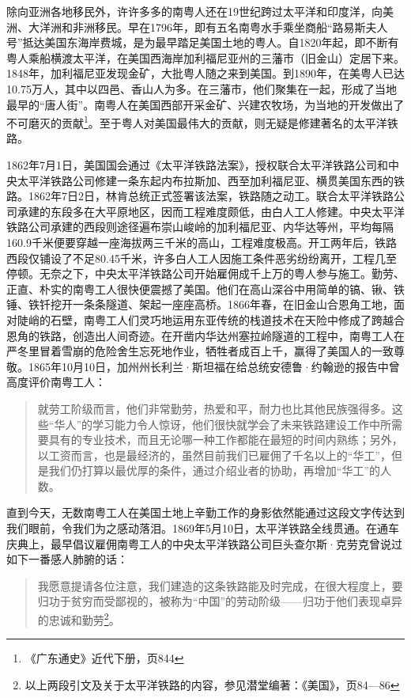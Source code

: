 除向亚洲各地移民外，许许多多的南粤人还在19世纪跨过太平洋和印度洋，向美洲、大洋洲和非洲移民。早在1796年，即有五名南粤水手乘坐商船“路易斯夫人号”抵达美国东海岸费城，是为最早踏足美国土地的粤人。自1820年起，即不断有粤人乘船横渡太平洋，在美国西海岸加利福尼亚州的三藩市（旧金山）定居下来。1848年，加利福尼亚发现金矿，大批粤人随之来到美国。到1890年，在美粤人已达10.75万人，其中以四邑、香山人为多。在三藩市，他们聚集在一起，形成了当地最早的“唐人街”。南粤人在美国西部开采金矿、兴建农牧场，为当地的开发做出了不可磨灭的贡献\footnote{《广东通史》近代下册，页844}。至于粤人对美国最伟大的贡献，则无疑是修建著名的太平洋铁路。

1862年7月1日，美国国会通过《太平洋铁路法案》，授权联合太平洋铁路公司和中央太平洋铁路公司修建一条东起内布拉斯加、西至加利福尼亚、横贯美国东西的铁路。1862年7日2日，林肯总统正式签署该法案，铁路随之动工。联合太平洋铁路公司承建的东段多在大平原地区，因而工程难度颇低，由白人工人修建。中央太平洋铁路公司承建的西段则途径遍布崇山峻岭的加利福尼亚、内华达等州，平均每隔160.9千米便要穿越一座海拔两三千米的高山，工程难度极高。开工两年后，铁路西段仅铺设了不足80.45千米，许多白人工人因施工条件恶劣纷纷离开，工程几至停顿。无奈之下，中央太平洋铁路公司开始雇佣成千上万的粤人参与施工。勤劳、正直、朴实的南粤工人很快便震撼了美国。他们在高山深谷中用简单的镐、锹、铁锤、铁钎挖开一条条隧道、架起一座座高桥。1866年春，在旧金山合恩角工地，面对陡峭的石壁，南粤工人们灵巧地运用东亚传统的栈道技术在天险中修成了跨越合恩角的铁路，创造出人间奇迹。在开凿内华达州塞拉岭隧道的工程中，南粤工人在严冬里冒着雪崩的危险舍生忘死地作业，牺牲者成百上千，赢得了美国人的一致尊敬。1865年10月10日，加州州长利兰·斯坦福在给总统安德鲁·约翰逊的报告中曾高度评价南粤工人：

\begin{quote}

就劳工阶级而言，他们非常勤劳，热爱和平，耐力也比其他民族强得多。这些“华人”的学习能力令人惊讶，他们很快就学会了未来铁路建设工作中所需要具有的专业技术，而且无论哪一种工作都能在最短的时间内熟练；另外，以工资而言，也是最经济的，虽然目前我们已雇佣了千名以上的“华工”，但是我们仍打算以最优厚的条件，通过介绍业者的协助，再增加“华工”的人数。

\end{quote}

直到今天，无数南粤工人在美国土地上辛勤工作的身影依然能通过这段文字传达到我们眼前，令我们为之感动落泪。1869年5月10日，太平洋铁路全线贯通。在通车庆典上，最早倡议雇佣南粤工人的中央太平洋铁路公司巨头查尔斯·克劳克曾说过如下一番感人肺腑的话：

\begin{quote}

我愿意提请各位注意，我们建造的这条铁路能及时完成，在很大程度上，要归功于贫穷而受鄙视的，被称为“中国”的劳动阶级——归功于他们表现卓异的忠诚和勤劳\footnote{以上两段引文及关于太平洋铁路的内容，参见潜堂编著：《美国》，页84—86}。

\end{quote}

